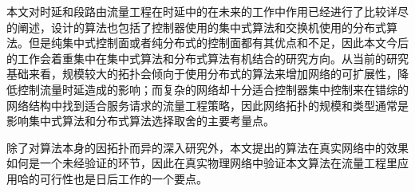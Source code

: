 本文对时延和段路由流量工程在时延中的在未来的工作中作用已经进行了比较详尽的阐述，设计的算法也包括了控制器使用的集中式算法和交换机使用的分布式算法。但是纯集中式控制面或者纯分布式的控制面都有其优点和不足，因此本文今后的工作会着重集中在集中式算法和分布式算法有机结合的研究方向。从当前的研究基础来看，规模较大的拓扑会倾向于使用分布式的算法来增加网络的可扩展性，降低控制流量时延造成的影响；而复杂的网络却十分适合控制器集中控制来在错综的网络结构中找到适合服务请求的流量工程策略，因此网络拓扑的规模和类型通常是影响集中式算法和分布式算法选择取舍的主要考量点。

除了对算法本身的因拓扑而异的深入研究外，本文提出的算法在真实网络中的效果如何是一个未经验证的环节，因此在真实物理网络中验证本文算法在流量工程里应用哈的可行性也是日后工作的一个要点。



\ifx\usechapbib\empty
\nocite{BSTcontrol}
\setcounter{NAT@ctr}{0}


\fi
